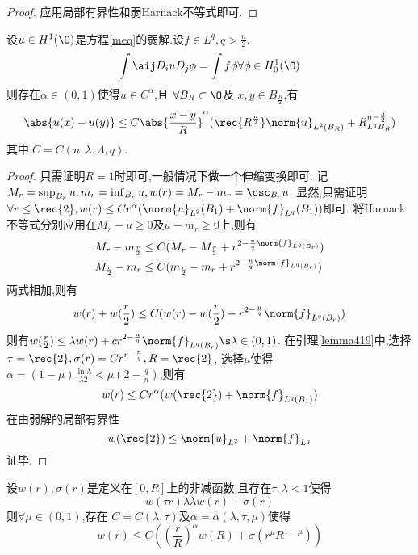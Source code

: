 \begin{proof}
    应用局部有界性和弱Harnack不等式即可.
\end{proof}
\begin{corollary}
    设$u \in H^1(\O)$是方程\eqref{meq}的弱解.设$f \in L^q, q>\frac{n}{2}$.
    \begin{equation}
        \int\aij D_iuD_j\phi = \int f\phi \forall \phi \in H^1_0(\O)
    \end{equation}
    则存在$\alpha \in (0,1)$使得$u \in C^\alpha$,且 $\forall B_R\subset \O$及 $x,y \in B_{\frac{R}{2}}$,有 
    \begin{equation}
        \abs{u(x)-u(y)} \le C\abs{\frac{x-y}{R}}^\alpha(\rec{R^{\frac{n}{2}}}\norm{u}_{L^2(B_R)}+R^{n-\frac{q}{2}}_{L^q{B_R}})
    \end{equation}
    其中,$C=C(n,\lambda,\Lambda,q)$.
\end{corollary}
\begin{proof}
    只需证明$R=1$时即可,一般情况下做一个伸缩变换即可. 记$M_r=\sup_{B_r}u, m_r=\inf_{B_r}u, w(r)=M_r-m_r=\osc_{B_r}u$. 显然,只需证明$\forall r \le \rec{2}, w(r) \le Cr^\alpha(\norm{u}_{L^2}(B_1)+\norm{f}_{L^q}(B_1))$即可. 将Harnack不等式分别应用在$M_r-u \ge 0$及$u-m_r \ge 0$上,则有
    \begin{align}
        &M_r-m_{\frac{r}{2}} \le C(M_r-M_{\frac{r}{2}}+r^{2-\frac{n}{q}\norm{f}_{L^q(B_r)}}) \\
        &M_{\frac{r}{2}} - m_r \le C(m_{\frac{r}{2}}-m_r+r^{2-\frac{n}{q}\norm{f}_{L^q(B_r)}})
    \end{align}
    两式相加,则有
    \begin{equation}
        w(r)+w(\frac{r}{2}) \le C(w(r)-w(\frac{r}{2})+r^{2-\frac{n}{q}}\norm{f}_{L^q(B_r)})
    \end{equation}
    则有$w(\frac{r}{2}) \le \lambda w(r)+cr^{2-\frac{n}{q}}\norm{f}_{L^q(B_r)} \s \lambda \in (0,1)$. 在引理\eqref{lemma419}中,选择$\tau=\rec{2}, \sigma(r)=Cr^{r-\frac{n}{q}},R=\rec{2}$, 选择$\mu$使得$\alpha=(1-\mu)\frac{\ln \lambda}{\lambda 2} < \mu(2-\frac{q}{n})$,则有
    \begin{equation}
        w(r)\le Cr^\alpha(w(\rec{2})+\norm{f}_{L^q(B_1)})
    \end{equation}
    在由弱解的局部有界性
    \begin{equation}
        w(\rec{2}) \le \norm{u}_{L^2}+\norm{f}_{L^q}
    \end{equation}
    证毕.
\end{proof}
\begin{lemma}\label{lemma419}
    设$w(r), \sigma(r)$是定义在$[0,R]$上的非减函数.且存在$\tau,\lambda <1$使得
    \begin{equation}
        w(\tau r) \lambda \lambda w(r)+\sigma(r)
    \end{equation}
    则$\forall \mu \in (0,1)$,存在 $C=C(\lambda,\tau)$及$\alpha=\alpha(\lambda,\tau,\mu)$使得
    \begin{equation}
        w(r)\le C((\frac{r}{R})^\alpha w(R)+\sigma(r^\mu R^{1-\mu}))
    \end{equation}
\end{lemma}
